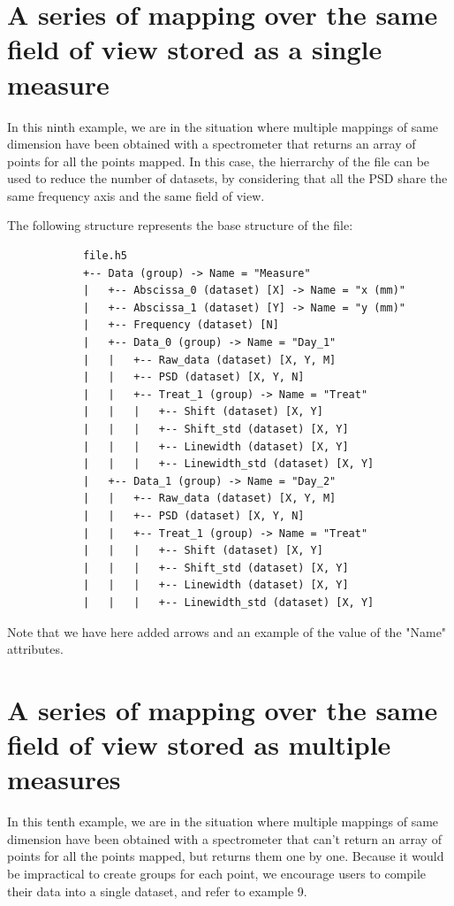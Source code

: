 \documentclass{book}
\begin{document}
    \section{A series of mapping over the same field of view stored as a single measure}
        In this ninth example, we are in the situation where multiple mappings of same dimension have been obtained with a spectrometer that returns an array of points for all the points mapped. In this case, the hierrarchy of the file can be used to reduce the number of datasets, by considering that all the PSD share the same frequency axis and the same field of view.

        The following structure represents the base structure of the file:
        \begin{verbatim}
            file.h5
            +-- Data (group) -> Name = "Measure"
            |   +-- Abscissa_0 (dataset) [X] -> Name = "x (mm)"
            |   +-- Abscissa_1 (dataset) [Y] -> Name = "y (mm)"
            |   +-- Frequency (dataset) [N]
            |   +-- Data_0 (group) -> Name = "Day_1"
            |   |   +-- Raw_data (dataset) [X, Y, M]
            |   |   +-- PSD (dataset) [X, Y, N]
            |   |   +-- Treat_1 (group) -> Name = "Treat"
            |   |   |   +-- Shift (dataset) [X, Y]
            |   |   |   +-- Shift_std (dataset) [X, Y]
            |   |   |   +-- Linewidth (dataset) [X, Y]
            |   |   |   +-- Linewidth_std (dataset) [X, Y]
            |   +-- Data_1 (group) -> Name = "Day_2"
            |   |   +-- Raw_data (dataset) [X, Y, M]
            |   |   +-- PSD (dataset) [X, Y, N]
            |   |   +-- Treat_1 (group) -> Name = "Treat"
            |   |   |   +-- Shift (dataset) [X, Y]
            |   |   |   +-- Shift_std (dataset) [X, Y]
            |   |   |   +-- Linewidth (dataset) [X, Y]
            |   |   |   +-- Linewidth_std (dataset) [X, Y]
        \end{verbatim}
        Note that we have here added arrows and an example of the value of the "Name" attributes.
    
    \section{A series of mapping over the same field of view stored as multiple measures}
        In this tenth example, we are in the situation where multiple mappings of same dimension have been obtained with a spectrometer that can't return an array of points for all the points mapped, but returns them one by one. Because it would be impractical to create groups for each point, we encourage users to compile their data into a single dataset, and refer to example 9.
    
\end{document}
